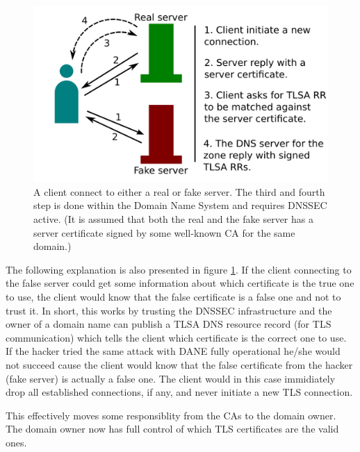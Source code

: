 \begin{figure}[ht]
\begin{center}
\includegraphics[scale=1]{Figures/daneWithTlsa.png}
\end{center}
\caption{A client connect to either a real or fake server. The third and fourth step is done within the Domain Name System and requires DNSSEC active. (It is assumed that both the real and the fake server has a server certificate signed by some well-known CA for the same domain.)\label{ch3:daneWithTlsa}}
\end{figure}

The following explanation is also presented in figure \ref{ch3:daneWithTlsa}.
If the client connecting to the false server could get some information about which certificate is the true one to use, the client would know that the false certificate is a false one and not to trust it.
In short, this works by trusting the DNSSEC infrastructure and the owner of a domain name can publish a TLSA DNS resource record (for TLS communication) which tells the client which certificate is the correct one to use.
If the hacker tried the same attack with DANE fully operational he/she would not succeed cause the client would know that the false certificate from the hacker (fake server) is actually a false one.
The client would in this case immidiately drop all established connections, if any, and never initiate a new TLS connection.

This effectively moves some responsiblity from the CAs to the domain owner.
The domain owner now has full control of which TLS certificates are the valid ones.

